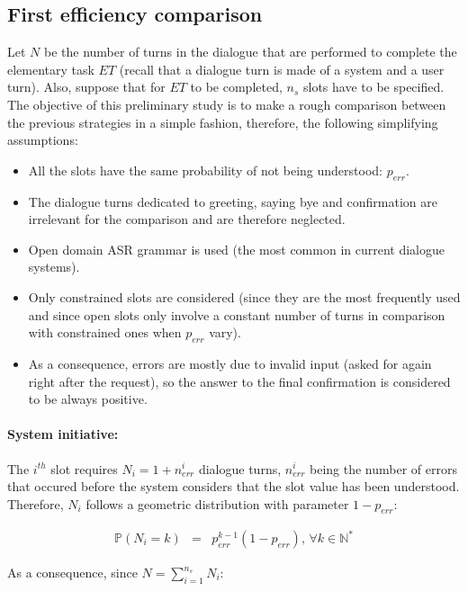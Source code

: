 	\subsection{First efficiency comparison}
	
		Let $N$ be the number of turns in the dialogue that are performed to complete the elementary task $ET$ (recall that a dialogue turn is made of a system and a user turn). Also, suppose that for $ET$ to be completed, $n_s$ slots have to be specified. The objective of this preliminary study is to make a rough comparison between the previous strategies in a simple fashion, therefore, the following simplifying assumptions:
		
		\begin{itemize}
			\item All the slots have the same probability of not being understood: $p_{err}$.
			\item The dialogue turns dedicated to greeting, saying bye and confirmation are irrelevant for the comparison and are therefore neglected.
			\item Open domain ASR grammar is used (the most common in current dialogue systems).
			\item Only constrained slots are considered (since they are the most frequently used and since open slots only involve a constant number of turns in comparison with constrained ones when $p_{err}$ vary).
			\item As a consequence, errors are mostly due to invalid input (asked for again right after the request), so the answer to the final confirmation is considered to be always positive.
		\end{itemize}

                \paragraph{System initiative:} The $i^{th}$ slot requires $N_i = 1 + n^i_{err}$ dialogue turns, $n^i_{err}$ being the number of errors that occured before the system considers that the slot value has been understood. Therefore, $N_i$ follows a geometric distribution with parameter $1-p_{err}$:

                     \begin{eqnarray}
                       \mathbb{P} (N_i = k) & = & p_{err}^{k-1} (1-p_{err}) \text{,  } \forall k \in \mathbb{N}^*
                     \end{eqnarray}

                     As a consequence, since $N = \sum_{i=1}^{n_s} N_i$:

